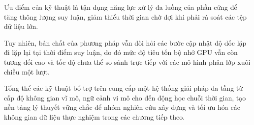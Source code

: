 Ưu điểm của kỹ thuật là tận dụng năng lực xử lý đa luồng của phần cứng để tăng thông lượng suy luận, giảm thiểu thời gian chờ đợi khi phải rà soát các tệp dữ liệu lớn.

Tuy nhiên, bản chất của phương pháp vẫn đòi hỏi các bước cập nhật độ dốc lặp đi lặp lại tại thời điểm suy luận, do đó mức độ tiêu tốn bộ nhớ GPU vẫn còn tương đối cao và tốc độ chưa thể so sánh trực tiếp với các mô hình phân lớp xuôi chiều một lượt.

Tổng thể các kỹ thuật bổ trợ trên cung cấp một hệ thống giải pháp đa tầng từ cấp độ không gian vĩ mô, ngữ cảnh vi mô cho đến động học chuỗi thời gian, tạo nền tảng lý thuyết vững chắc để nhóm nghiên cứu xây dựng và tối ưu hóa các không gian dữ liệu thực nghiệm trong các chương tiếp theo.
